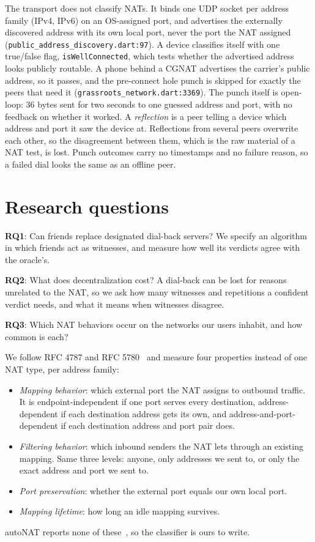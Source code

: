 \documentclass[11pt]{article}
\newcommand{\code}[1]{\texttt{\small #1}}
\begin{document}
The transport does not classify NATs. It binds one UDP socket per address family (IPv4, IPv6) on an OS-assigned port, and advertises the externally discovered address with its own local port, never the port the NAT assigned (\code{public\_address\_discovery.dart:97}). A device classifies itself with one true/false flag, \code{isWellConnected}, which tests whether the advertised address looks publicly routable. A phone behind a CGNAT advertises the carrier's public address, so it passes, and the pre-connect hole punch is skipped for exactly the peers that need it (\code{grassroots\_network.dart:3369}). The punch itself is open-loop: 36 bytes sent for two seconds to one guessed address and port, with no feedback on whether it worked. A \emph{reflection} is a peer telling a device which address and port it saw the device at. Reflections from several peers overwrite each other, so the disagreement between them, which is the raw material of a NAT test, is lost. Punch outcomes carry no timestamps and no failure reason, so a failed dial looks the same as an offline peer.

\section{Research questions}

\textbf{RQ1}: Can friends replace designated dial-back servers? We specify an algorithm in which friends act as witnesses, and measure how well its verdicts agree with the oracle's.

\textbf{RQ2}: What does decentralization cost? A dial-back can be lost for reasons unrelated to the NAT, so we ask how many witnesses and repetitions a confident verdict needs, and what it means when witnesses disagree.

\textbf{RQ3}: Which NAT behaviors occur on the networks our users inhabit, and how common is each?

We follow RFC 4787 and RFC 5780~\cite{rfc4787,rfc5780} and measure four properties instead of one NAT type, per address family:
\begin{itemize}
  \item \emph{Mapping behavior}: which external port the NAT assigns to outbound traffic. It is endpoint-independent if one port serves every destination, address-dependent if each destination address gets its own, and address-and-port-dependent if each destination address and port pair does.
  \item \emph{Filtering behavior}: which inbound senders the NAT lets through an existing mapping. Same three levels: anyone, only addresses we sent to, or only the exact address and port we sent to.
  \item \emph{Port preservation}: whether the external port equals our own local port.
  \item \emph{Mapping lifetime}: how long an idle mapping survives.
\end{itemize}
autoNAT reports none of these~\cite{autonat}, so the classifier is ours to write.
\end{document}
